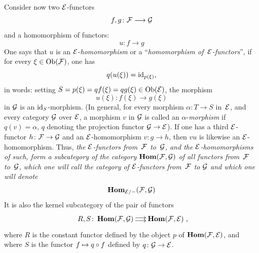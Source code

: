 Consider now two $\cal{E}$-functors
$$
f,g\colon \cal{F}\to\cal{G}
$$
and a homomorphism of functors:
$$
u\colon f\to g
$$
One says that $u$ is an $\cal{E}$-\emph{homomorphism} or a
``\emph{homomorphism of~$\cal{E}$-functors}'', if for every
$\xi\in\Ob(\cal{F})$, one has
$$
q(u(\xi))=\id_{p(\xi)} \quoi\text{,}
$$
in words: setting
$S=p(\xi)=qf(\xi)=qg(\xi)\in\Ob(\cal{E})$,
the morphism
$$
u(\xi)\colon f(\xi)\to g(\xi)
$$
in $\cal{G}$ is an $\id_S$-morphism. (In
general, for every morphism $\alpha\colon T \to S$
in~$\cal{E}$, and every category $\cal{G}$ over
$\cal{E}$, a morphism $v$ in $\cal{G}$ is called an
$\alpha$-\emph{morphism} if $q(v)=\alpha$, $q$ denoting the
projection functor $\cal{G}\to \cal{E}$). If one has a third
$\cal{E}$-functor $h\colon \cal{F}\to \cal{G}$ and an
$\cal{E}$-homomorphism $v\colon g\to h$, then $vu$ is likewise
an $\cal{E}$-homomorphism. Thus,
\emph{the $\cal{E}$-functors from~$\cal{F}$ to~$\cal{G}$, and
the $\cal{E}$-homomorphisms of such, form a subcategory
of the category $\SheafHom(\cal{F},\cal{G})$ of all functors
from~$\cal{F}$ to~$\cal{G}$, which one will call the category of
$\cal{E}$-functors from~$\cal{F}$ to $\cal{G}$ and which one will denote}
$$
\SheafHom_{\cal{E}/-}(\cal{F},\cal{G})
$$
It is also the kernel subcategory of the pair of functors
$$
\xymatrix@C=.5cm{R,S\colon\SheafHom(\cal{F},\cal{G})
\ar@<2pt>[r]\ar@<-2pt>[r]&\SheafHom(\cal{F},\cal{E})}\quoi\text{,}
$$
where $R$ is the constant functor defined by the object $p$ of
$\SheafHom(\cal{F},\cal{E})$, and where $S$ is the functor $f\mto
q\circ f$ defined by $q\colon\cal{G}\to\cal{E}$.

